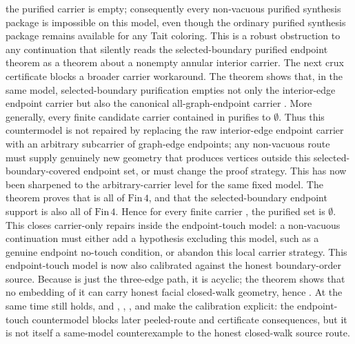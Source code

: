 \documentclass[11pt]{article}
\begin{document}
the purified carrier is empty; consequently every non-vacuous purified
synthesis package is impossible on this model, even though the ordinary
purified synthesis package remains available for any Tait coloring.  This is a
robust obstruction to any continuation that silently reads the selected-boundary
purified endpoint theorem as a theorem about a nonempty annular interior
carrier.
The next crux certificate blocks a broader carrier workaround.  The theorem
shows that, in the same model, selected-boundary purification empties not only
the interior-edge endpoint carrier but also the canonical all-graph-endpoint
carrier .  More generally, every
finite candidate carrier contained in  purifies
to \(\emptyset\).  Thus this countermodel is not repaired by replacing the raw
interior-edge endpoint carrier with an arbitrary subcarrier of graph-edge
endpoints; any non-vacuous route must supply genuinely new geometry that
produces vertices outside this selected-boundary-covered endpoint set, or must
change the proof strategy.
This has now been sharpened to the arbitrary-carrier level for the same fixed
model.  The theorem
 proves that
 is all of \(\mathrm{Fin}\,4\), and that the
selected-boundary endpoint support is also all of \(\mathrm{Fin}\,4\).  Hence
for every finite carrier , the purified set
is \(\emptyset\).  This closes carrier-only repairs inside the endpoint-touch
model: a non-vacuous continuation must either add a hypothesis excluding this
model, such as a genuine endpoint no-touch condition, or abandon this local
carrier strategy.
This endpoint-touch model is now also calibrated against the honest
boundary-order source.  Because  is just the
three-edge path, it is acyclic; the theorem
shows that no embedding of it can carry honest facial closed-walk geometry,
hence
.
At the same time
still holds, and
,
,
,
and
make the calibration explicit: the endpoint-touch countermodel blocks later
peeled-route and certificate consequences, but it is not itself a same-model
counterexample to the honest closed-walk source route.
\end{document}
